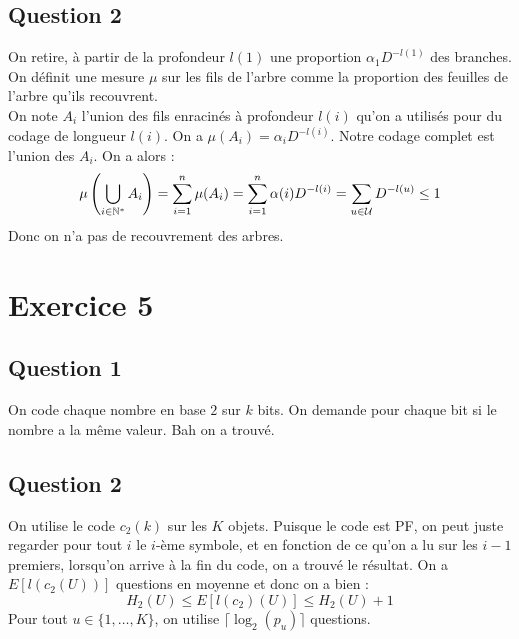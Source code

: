 \documentclass{cours}
\begin{document}
\subsection{Question 2}
On retire, à partir de la profondeur $l(1)$ une proportion $\alpha_{1}D^{-l(1)}$ des branches. On définit une mesure $\mu$ sur les fils de l'arbre comme la proportion des feuilles de l'arbre qu'ils recouvrent. \\
On note $A_{i}$ l'union des fils enracinés à profondeur $l(i)$ qu'on a utilisés pour du codage de longueur $l(i)$. On a $\mu(A_{i}) = \alpha_{i}D^{-l(i)}$. Notre codage complet est l'union des $A_{i}$. On a alors : 
\[
    \mu\left(\bigcup_{i \in \mathbb{N}^{*}} A_{i}\right) = \sum_{i = 1}^{n} \mu(A_{i}) = \sum_{i = 1}^{n}\alpha(i)D^{-l(i)} = \sum_{u \in \mathcal{U}} D^{-l(u)} \leq 1
\]
Donc on n'a pas de recouvrement des arbres. 


\section{Exercice 5}
\subsection{Question 1}
On code chaque nombre en base $2$ sur $k$ bits. On demande pour chaque bit si le nombre a la même valeur. Bah on a trouvé.

\subsection{Question 2}
On utilise le code $c_{2}(k)$ sur les $K$ objets. 
Puisque le code est PF, on peut juste regarder pour tout $i$ le $i$-ème symbole, et en fonction de ce qu'on a lu sur les $i-1$ premiers, lorsqu'on arrive à la fin du code, on a trouvé le résultat. 
On a $E[l(c_{2}(U))]$ questions en moyenne et donc on a bien : 
\[
    H_{2}(U) \leq E[l(c_{2})(U)] \leq H_{2}(U) + 1
\]
Pour tout $u \in \{1, \ldots, K\}$, on utilise $\lceil\log_{2}(p_{u})\rceil$ questions.
\end{document}
